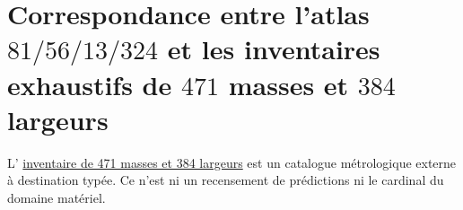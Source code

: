 \section{Correspondance entre l’atlas \(81/56/13/324\) et les inventaires exhaustifs de \(471\) masses et \(384\) largeurs}
\label{chap:portal-atlas-inventarios-masas}
L’ \hyperref[chap:inventario-universal-471-masas-384-anchuras]{inventaire de 471 masses et 384 largeurs} est un catalogue métrologique externe à destination typée. Ce n’est ni un recensement de prédictions ni le cardinal du domaine matériel.
